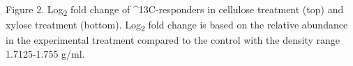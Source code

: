 Figure 2.  Log\textsubscript{2} fold change of ^{13}C-responders in cellulose treatment (top) and xylose treatment (bottom).  Log\textsubscript{2} fold change is based on the relative abundance in the experimental treatment compared to the control with the density range 1.7125-1.755 g/ml.